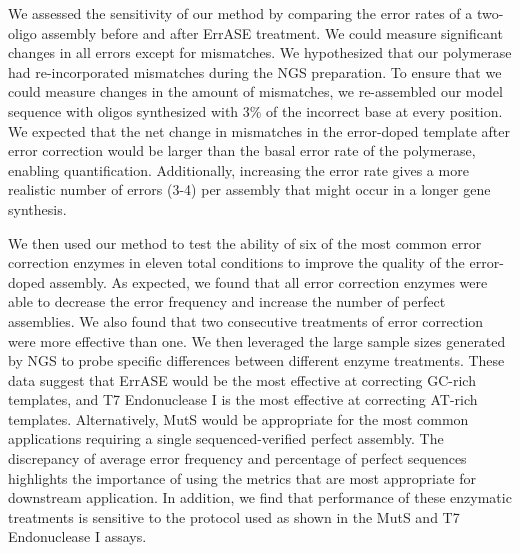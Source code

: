 \documentclass[twocolumn]{article}
\begin{document}
We assessed the sensitivity of our method by comparing the error rates of a two-oligo assembly before and after ErrASE treatment. We could measure significant changes in all errors except for mismatches. We hypothesized that our polymerase had re-incorporated mismatches during the NGS preparation. To ensure that we could measure changes in the amount of mismatches, we re-assembled our model sequence with oligos synthesized with 3\% of the incorrect base at every position. We expected that the net change in mismatches in the error-doped template after error correction would be larger than the basal error rate of the polymerase, enabling quantification. Additionally, increasing the error rate gives a more realistic number of errors (3-4) per assembly that might occur in a longer gene synthesis.

We then used our method to test the ability of six of the most common error correction enzymes in eleven total conditions to improve the quality of the error-doped assembly. As expected, we found that all error correction enzymes were able to decrease the error frequency and increase the number of perfect assemblies. We also found that two consecutive treatments of error correction were more effective than one. We then leveraged the large sample sizes generated by NGS to probe specific differences between different enzyme treatments. These data suggest that ErrASE would be the most effective at correcting GC-rich templates, and T7 Endonuclease I is the most effective at correcting AT-rich templates. Alternatively, MutS would be appropriate for the most common applications requiring a single sequenced-verified perfect assembly. The discrepancy of average error frequency and percentage of perfect sequences highlights the importance of using the metrics that are most appropriate for downstream application. In addition, we find that performance of these enzymatic treatments is sensitive to the protocol used as shown in the MutS and T7 Endonuclease I assays.
\end{document}
